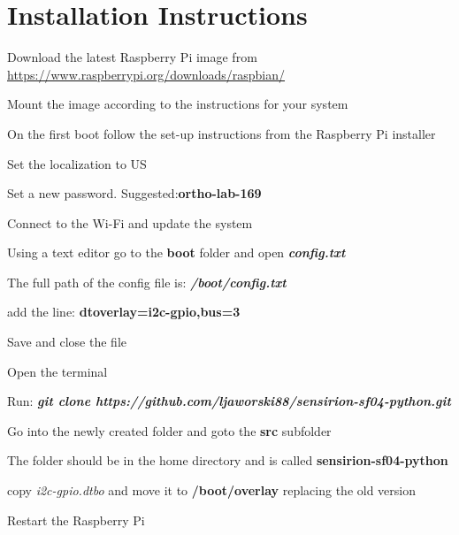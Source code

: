 \documentclass[12pt]{article}
\begin{document}
\tableofcontents

\newpage

\section{Installation Instructions}

\begin{inparaenum}
    \item Download the latest Raspberry Pi image from \url{https://www.raspberrypi.org/downloads/raspbian/}
    \item Mount the image according to the instructions for your system
    \item On the first boot follow the set-up instructions from the Raspberry Pi installer
    \begin{inparaenum}
        \item Set the localization to US
        \item Set a new password. Suggested:\textbf{ortho-lab-169}
        \item Connect to the Wi-Fi and update the system
    \end{inparaenum}
    \item Using a text editor go to the \textbf{boot} folder and open \textit{\textbf{config.txt}}
    \begin{inparaenum}
    \item The full path of the config file is: \textit{\textbf{/boot/config.txt}}
    \end{inparaenum}
    \item add the line: \textbf{dtoverlay=i2c-gpio,bus=3}
    \item Save and close the file
    \item Open the terminal
    \item Run: \textbf{\textit{git clone https://github.com/ljaworski88/sensirion-sf04-python.git}}
    \item Go into the newly created folder and goto the \textbf{src} subfolder
    \begin{inparaenum}
    \item The folder should be in the home directory and is called \textbf{sensirion-sf04-python} 
    \end{inparaenum}
    \item copy \textit{i2c-gpio.dtbo} and move it to \textbf{/boot/overlay} replacing the old version
    \item Restart the Raspberry Pi
\end{inparaenum}
\end{document}
